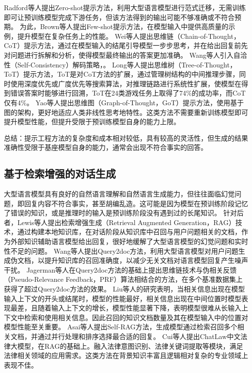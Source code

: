 Radford等人\cite{radford2019language}提出Zero-shot提示方法，利用大型语言模型进行范式迁移，无需训练即可让预训练模型完成下游任务，但该方法得到的输出可能不够准确或不符合预期。
为此，Brown等人\cite{DBLP:conf/nips/BrownMRSKDNSSAA20}提出Few-shot提示方法，在模型输入中提供高质量的示例，提升模型在复杂任务上的性能。
Wei等人\cite{DBLP:conf/nips/Wei0SBIXCLZ22}提出思维链（Chain-of-Thought，CoT）提示方法，通过在模型输入的结尾引导模型一步步思考，并在给出回复前先对问题进行拆解和分析，使得模型最终输出的答案更加准确。
Wang等人\cite{DBLP:conf/iclr/0002WSLCNCZ23}引入自洽性（Self-Consistency）解码策略，。
Long等人\cite{DBLP:journals/corr/abs-2305-08291}提出思维树（Tree-of-Thought，ToT）提示方法，ToT是对CoT方法的扩展，通过管理树结构的中间推理步骤，同时使用深度优先或广度优先等搜索算法，对推理链路进行系统性扩展，使模型在得到错误答案时能够进行回溯，ToT在24类游戏任务上取得了74\%的成功率，而CoT仅有4\%。
Yao等人\cite{DBLP:journals/corr/abs-2305-16582}提出思维图（Graph-of-Thought，GoT）提示方法，使用基于图的架构，更好地适应人类非线性思考地特性。这类方法不需要重新训练模型即可提升模型性能，但提升受限于预训练模型自身的能力上限。

总结：提示工程方法的复杂度和成本相对较低，具有较高的灵活性，但生成的结果准确性受限于基座模型自身的能力，通常会出现不符合事实的回答。

\subsection{基于检索增强的对话生成}

大型语言模型具有良好的自然语言理解和自然语言生成能力，但往往面临幻觉问题，即回复内容不符合事实，甚至胡编乱造。这可能是因为模型在预训练阶段记忆了错误的知识，或是推理时的输入是预训练阶段没有遇到过的长尾知识。
针对后者，Lewis等人\cite{DBLP:conf/nips/LewisPPPKGKLYR020}提出检索增强生成（Retrieval Augmented Generation，RAG）技术，通过构建本地知识库，在对话阶段从知识库中召回与用户问题相关的文档，作为外部知识辅助语言模型给出回复，很好地缓解了大型语言模型的幻觉问题和实时性不足的问题。
Wang等人\cite{DBLP:conf/emnlp/WangYW23}提出Query2doc方法，利用大型语言模型对用户问题生成伪文档，以提升知识库的召回准确度，以减少无关文档对语言模型回复产生噪声干扰。
Jagerman等人\cite{DBLP:journals/corr/abs-2305-03653}在Query2doc方法的基础上提出思维链技术与伪相关反馈（Pseudo-Relevance Feedback，PRF）算法相结合的方法，在多个基准数据集上获得了超过Query2doc方法的效果。
Liu等人\cite{DBLP:journals/corr/abs-2307-03172}的研究表明，当相关信息出现在模型输入上下文的开头或结尾时，模型的性能最好，相关信息出现在中间位置时模型表现最差，且随着输入上下文的增长，模型性能显著下降，表明模型很难从长输入上下文中检索和使用相关信息。因此召回的知识文档数量及其在模型输入中的位置对模型性能至关重要。
Asai等人\cite{DBLP:journals/corr/abs-2310-11511}提出Self-RAG方法，生成模型通过检索召回多个相关文档，并通过并行处理和排序选择最合适的回复。
Cui等人\cite{DBLP:journals/corr/abs-2306-16092}提出ChatLaw中文法律大模型，在RAG的基础上。融入法律意图识别、法律关键词提取等模块，满足法律相关领域的应用需求。这类方法在背景知识丰富且逻辑相对复杂的专业领域上表现不佳。

